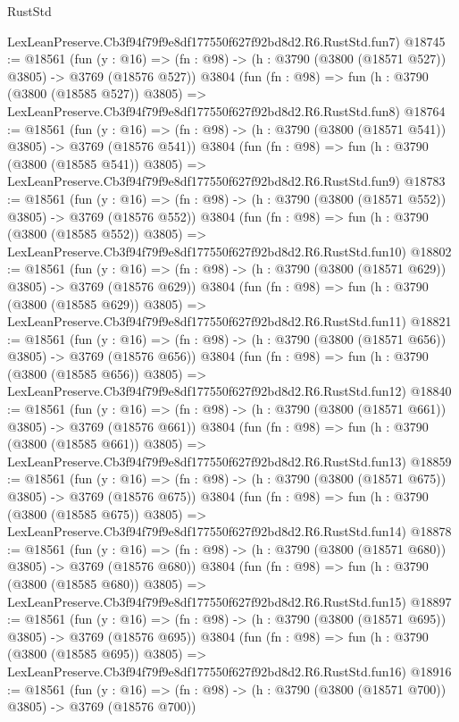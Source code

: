 \begin{lexlean}{RustStd}
\begin{coremodule}
    LexLeanPreserve.Cb3f94f79f9e8df177550f627f92bd8d2.R6.RustStd.fun7)
@18745 := @18561
    (fun (y : @16) => (fn : @98) -> (h : @3790 (@3800 (@18571 @527)) @3805) -> @3769 (@18576 @527))
    @3804
    (fun (fn : @98) =>
    fun (h : @3790 (@3800 (@18585 @527)) @3805) =>
    LexLeanPreserve.Cb3f94f79f9e8df177550f627f92bd8d2.R6.RustStd.fun8)
@18764 := @18561
    (fun (y : @16) => (fn : @98) -> (h : @3790 (@3800 (@18571 @541)) @3805) -> @3769 (@18576 @541))
    @3804
    (fun (fn : @98) =>
    fun (h : @3790 (@3800 (@18585 @541)) @3805) =>
    LexLeanPreserve.Cb3f94f79f9e8df177550f627f92bd8d2.R6.RustStd.fun9)
@18783 := @18561
    (fun (y : @16) => (fn : @98) -> (h : @3790 (@3800 (@18571 @552)) @3805) -> @3769 (@18576 @552))
    @3804
    (fun (fn : @98) =>
    fun (h : @3790 (@3800 (@18585 @552)) @3805) =>
    LexLeanPreserve.Cb3f94f79f9e8df177550f627f92bd8d2.R6.RustStd.fun10)
@18802 := @18561
    (fun (y : @16) => (fn : @98) -> (h : @3790 (@3800 (@18571 @629)) @3805) -> @3769 (@18576 @629))
    @3804
    (fun (fn : @98) =>
    fun (h : @3790 (@3800 (@18585 @629)) @3805) =>
    LexLeanPreserve.Cb3f94f79f9e8df177550f627f92bd8d2.R6.RustStd.fun11)
@18821 := @18561
    (fun (y : @16) => (fn : @98) -> (h : @3790 (@3800 (@18571 @656)) @3805) -> @3769 (@18576 @656))
    @3804
    (fun (fn : @98) =>
    fun (h : @3790 (@3800 (@18585 @656)) @3805) =>
    LexLeanPreserve.Cb3f94f79f9e8df177550f627f92bd8d2.R6.RustStd.fun12)
@18840 := @18561
    (fun (y : @16) => (fn : @98) -> (h : @3790 (@3800 (@18571 @661)) @3805) -> @3769 (@18576 @661))
    @3804
    (fun (fn : @98) =>
    fun (h : @3790 (@3800 (@18585 @661)) @3805) =>
    LexLeanPreserve.Cb3f94f79f9e8df177550f627f92bd8d2.R6.RustStd.fun13)
@18859 := @18561
    (fun (y : @16) => (fn : @98) -> (h : @3790 (@3800 (@18571 @675)) @3805) -> @3769 (@18576 @675))
    @3804
    (fun (fn : @98) =>
    fun (h : @3790 (@3800 (@18585 @675)) @3805) =>
    LexLeanPreserve.Cb3f94f79f9e8df177550f627f92bd8d2.R6.RustStd.fun14)
@18878 := @18561
    (fun (y : @16) => (fn : @98) -> (h : @3790 (@3800 (@18571 @680)) @3805) -> @3769 (@18576 @680))
    @3804
    (fun (fn : @98) =>
    fun (h : @3790 (@3800 (@18585 @680)) @3805) =>
    LexLeanPreserve.Cb3f94f79f9e8df177550f627f92bd8d2.R6.RustStd.fun15)
@18897 := @18561
    (fun (y : @16) => (fn : @98) -> (h : @3790 (@3800 (@18571 @695)) @3805) -> @3769 (@18576 @695))
    @3804
    (fun (fn : @98) =>
    fun (h : @3790 (@3800 (@18585 @695)) @3805) =>
    LexLeanPreserve.Cb3f94f79f9e8df177550f627f92bd8d2.R6.RustStd.fun16)
@18916 := @18561
    (fun (y : @16) => (fn : @98) -> (h : @3790 (@3800 (@18571 @700)) @3805) -> @3769 (@18576 @700))

\end{coremodule}
\end{lexlean}
